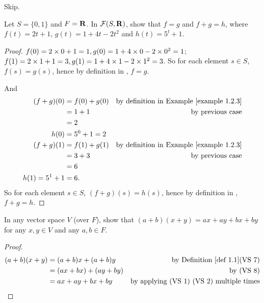 \begin{exercise} \label{exercise 1.2.6}
Skip.
\end{exercise}

\begin{exercise} \label{exercise 1.2.7}
Let \(S = \{0, 1\}\) and \(F = \mathbf{R}\).
In \(\mathcal{F}(S, \mathbf{R})\), show that \(f = g\) and \(f + g = h\),
where \(f(t) = 2t + 1\), \(g(t) = 1 + 4t - 2t^2\) and \(h(t) = 5^t + 1\).
\end{exercise}

\begin{proof}
\(f(0) = 2 \times 0 + 1 = 1, g(0) = 1 + 4 \times 0 - 2 \times 0^2 = 1\);
\(f(1) = 2 \times 1 + 1 = 3, g(1) = 1 + 4 \times 1 - 2 \times 1^2 = 3\).
So for each element \(s \in S\), \(f(s) = g(s)\), hence by definition in , \(f = g\).

And
\begin{align*}
    (f + g)(0) & = f(0) + g(0) & \text{by definition in \EXAMPLE{1.2.3}} \\
               & = 1 + 1 & \text{by previous case} \\
               & = 2 \\
    h(0) & = 5^0 + 1 = 2 \\
    (f + g)(1) & = f(1) + g(1) & \text{by definition in \EXAMPLE{1.2.3}} \\
               & = 3 + 3 & \text{by previous case} \\
               & = 6 \\
    h(1) = 5^1 + 1 & = 6.
\end{align*}
So for each element \(s \in S\), \((f + g)(s) = h(s)\), hence by definition in , \(f + g = h\).
\end{proof}

\begin{exercise} \label{exercise 1.2.8}
In any vector space \(V\) (over \(F\)), show that \((a + b)(x + y) = ax+ ay + bx + by\) for any \(x, y \in V\) and any \(a, b \in F\).
\end{exercise}

\begin{proof}
\begin{align*}
    (a + b)(x + y) & = (a + b)x + (a + b)y & \text{by \DEF{1.1}(VS 7)} \\
                   & = (ax + bx) + (ay + by) & \text{by (VS 8)} \\
                   & = ax + ay + bx + by & \text{by applying (VS 1) (VS 2) multiple times}
\end{align*}
\end{proof}

